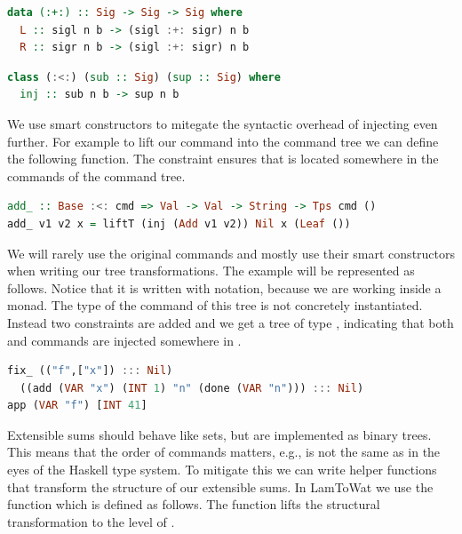 \begin{lstlisting}[language=Haskell]
data (:+:) :: Sig -> Sig -> Sig where
  L :: sigl n b -> (sigl :+: sigr) n b
  R :: sigr n b -> (sigl :+: sigr) n b
\end{lstlisting}

\begin{lstlisting}[language=Haskell]
class (:<:) (sub :: Sig) (sup :: Sig) where
  inj :: sub n b -> sup n b
\end{lstlisting}

We use smart constructors to mitegate the syntactic overhead of injecting \autocite{DBLP:conf/haskell/WuSH14, DBLP:conf/popl/LiangHJ95} even further. For example to lift our  command into the command tree we can define the following function. The constraint  ensures that  is located somewhere in the commands of the command tree.

\begin{lstlisting}[language=Haskell]
add_ :: Base :<: cmd => Val -> Val -> String -> Tps cmd ()
add_ v1 v2 x = liftT (inj (Add v1 v2)) Nil x (Leaf ())
\end{lstlisting}

We will rarely use the original commands and mostly use their smart constructors when writing our tree transformations. The  example will be represented as follows. Notice that it is written with  notation, because we are working inside a monad. The type of the command of this tree is not concretely instantiated. Instead two constraints are added and we get a tree of type , indicating that both  and  commands are injected somewhere in .

\begin{lstlisting}[language=Haskell]
fix_ (("f",["x"]) ::: Nil)
  ((add (VAR "x") (INT 1) "n" (done (VAR "n"))) ::: Nil)
app (VAR "f") [INT 41]
\end{lstlisting}

Extensible sums should behave like sets, but are implemented as binary trees. This means that the order of commands matters, e.g.,  is not the same as  in the eyes of the Haskell type system. To mitigate this we can write helper functions that transform the structure of our extensible sums. In LamToWat we use the  function which is defined as follows. The  function lifts the structural transformation to the level of .

